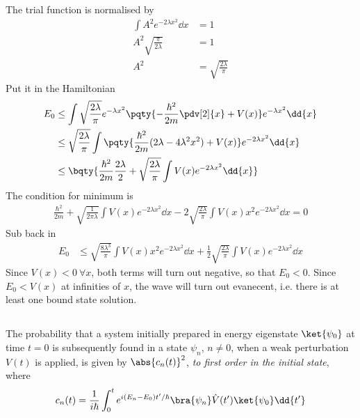 \documentclass[12pt]{article}
\begin{document}
        \subsubsection{} The trial function is normalised by \begin{align*}
            \int A^2 e^{ - 2\lambda x^2} \dd{x} &= 1\\
            A^2 \sqrt{\frac{\pi}{2\lambda}} &= 1\\
            A^2 &= \sqrt{\frac{2\lambda}{\pi}}
        \end{align*}
        Put it in the Hamiltonian \begin{align*}
            E_0&\leq \int \sqrt{\frac{2\lambda}{\pi}}e^{ - \lambda x^2}\pqty{ - \frac{\hbar^2}{2m}\pdv[2]{x} + V(x)}e^{ - \lambda x^2} \dd{x}\\
            &\leq \sqrt{\frac{2\lambda}{\pi}}\int \pqty{ \frac{\hbar^2}{2m}(2\lambda - 4\lambda^2 x^2) + V(x)}e^{ - 2\lambda x^2} \dd{x}\\
            &\leq \bqty{\frac{\hbar^2}{2m} \frac{2 \lambda}{2} + \sqrt{\frac{2\lambda}{\pi}} \int  V(x)e^{ - 2\lambda x^2} \dd{x}}
        \end{align*}
        The condition for minimum is \begin{align*}
            {\frac{\hbar^2}{2m} + \sqrt{\frac{1}{2\pi\lambda}} \int  V(x)e^{ - 2\lambda x^2} \dd{x} - 2 \sqrt{\frac{2\lambda}{\pi}} \int  V(x)x^2e^{ - 2\lambda x^2} \dd{x}} = 0
        \end{align*}
        Sub back in \begin{align*}
            E_0 &\leq {\sqrt{\frac{8\lambda^3}{\pi}} \int  V(x)x^2e^{ - 2\lambda x^2} \dd{x} + \frac{1}{2}{\sqrt{\frac{2\lambda}{\pi}} } \int  V(x)e^{ - 2\lambda x^2} \dd{x}}
        \end{align*}
        Since \(V(x) < 0\ \forall x\), both terms will turn out negative, so that \(E_0 < 0\). Since \(E_0 < V(x)\) at infinities of \(x\), the wave will turn out evanecent, i.e. there is at least one bound state solution.
        \subsection{} The probability that a system initially prepared in energy eigenstate \(\ket{\psi_0} \) at time \(t = 0\) is subsequently found in a state \(\psi_n\), \(n\neq 0\), when a weak perturbation \(V(t)\) is applied, is given by \(\abs{c_n(t)}^2\), \emph{to first order in the initial state}, where \[
            c_n(t) = \frac{1}{i\hbar}\int_0^t e^{i(E_n - E_0)t'/\hbar} \bra{\psi_n} \hat{V}(t') \ket{\psi_0} \dd{t'} 
        \]
\end{document}
